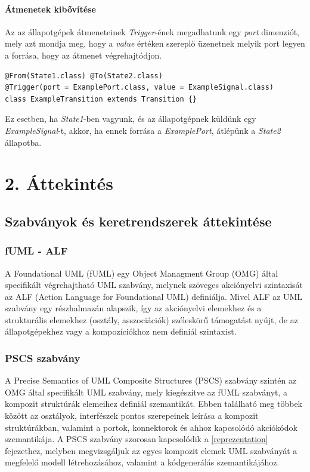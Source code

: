 \documentclass[a4paper,12pt]{report}
\begin{document}
\subsubsection{Átmenetek kibővítése}
Az az állapotgépek átmeneteinek  \textit{Trigger}-ének megadhatunk egy \textit{port} dimenziót, mely azt mondja meg, hogy a \textit{value} értéken szereplő üzenetnek melyik port legyen a forrása, hogy az átmenet végrehajtódjon.
\begin{lstlisting}
@From(State1.class) @To(State2.class)
@Trigger(port = ExamplePort.class, value = ExampleSignal.class)
class ExampleTransition extends Transition {}
\end{lstlisting}

Ez esetben, ha \textit{State1}-ben vagyunk, és az állapotgépnek küldünk egy  \textit{ExampleSignal}-t, akkor, ha ennek forrása a \textit{ExamplePort}, átlépünk a \textit{State2} állapotba.

\chapter*{2. Áttekintés}
\section{Szabványok és keretrendszerek áttekintése}
\subsection{fUML - ALF}
A Foundational UML (fUML) \cite{fmul} egy Object Managment Group (OMG) által specifikált végrehajtható UML szabvány, 
melynek szöveges akciónyelvi szintaxisát az ALF (Action Language for Foundational UML) \cite{alf} definiálja.
Mivel ALF az UML szabvány egy részhalmazán alapszik, így az akciónyelvi elemekhez és a strukturális elemekhez (osztály, asszociációk)  széleskörű támogatást nyújt, de az állapotgépekhez vagy a kompozíciókhoz nem definiál szintaxist.

\subsection{PSCS szabvány}
A  Precise Semantics of UML Composite Structures (PSCS)  szabvány \cite{pscs} szintén az OMG által specifikált UML szabvány, mely kiegészítve az fUML szabványt, a kompozit struktúrák elemeihez definiál szemantikát. Ebben található meg többek között az osztályok, interfészek pontos szerepeinek leírása a kompozit struktúrákban, valamint a portok, konnektorok és ahhoz kapcsolódó akciókódok szemantikája. A PSCS szabvány szorosan kapcsolódik a \ref{reprezentation} fejezethez, melyben megvizsgáljuk az egyes kompozit elemek UML szabványát a megfelelő modell létrehozásához, valamint a kódgenerálás szemantikájához.
\end{document}
